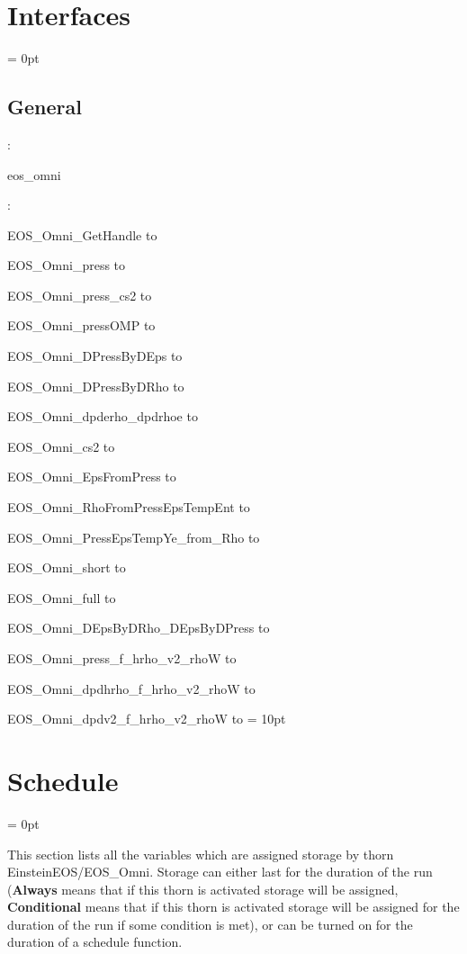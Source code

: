 \section{Interfaces} 


\parskip = 0pt

\vspace{3mm} \subsection*{General}

: 

eos\_omni
\vspace{2mm}

\vspace{5mm}

: 



EOS\_Omni\_GetHandle to 

EOS\_Omni\_press to 

EOS\_Omni\_press\_cs2 to 

EOS\_Omni\_pressOMP to 

EOS\_Omni\_DPressByDEps to 

EOS\_Omni\_DPressByDRho to 

EOS\_Omni\_dpderho\_dpdrhoe to 

EOS\_Omni\_cs2 to 

EOS\_Omni\_EpsFromPress to 

EOS\_Omni\_RhoFromPressEpsTempEnt to 

EOS\_Omni\_PressEpsTempYe\_from\_Rho to 

EOS\_Omni\_short to 

EOS\_Omni\_full to 

EOS\_Omni\_DEpsByDRho\_DEpsByDPress to 

EOS\_Omni\_press\_f\_hrho\_v2\_rhoW to 

EOS\_Omni\_dpdhrho\_f\_hrho\_v2\_rhoW to 

EOS\_Omni\_dpdv2\_f\_hrho\_v2\_rhoW to 
\vspace{2mm}\parskip = 10pt 

\section{Schedule} 


\parskip = 0pt


\noindent This section lists all the variables which are assigned storage by thorn EinsteinEOS/EOS\_Omni.  Storage can either last for the duration of the run ({\bf Always} means that if this thorn is activated storage will be assigned, {\bf Conditional} means that if this thorn is activated storage will be assigned for the duration of the run if some condition is met), or can be turned on for the duration of a schedule function.


